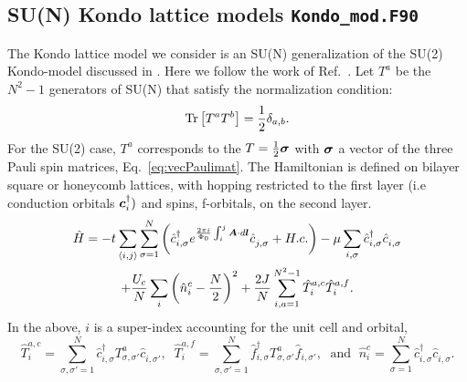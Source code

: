 

\subsection{SU(N) Kondo lattice models \texttt{Kondo\_mod.F90}}  \label{sec:kondo}

The Kondo lattice model we consider is an SU(N) generalization of the SU(2) Kondo-model discussed in \cite{Capponi00,Assaad99a}.
Here we follow the work of  Ref.~\cite{Raczkowski20}.
Let $T^{a}$ be the $N^2 -1  $ generators of SU(N) that satisfy the normalization condition: 
\begin{equation}
	\mathop{\mathrm{Tr}}  \left[ T^{a} T^{b} \right]   = \frac{1}{2}\delta_{a,b}.
\label{Normalization_condition.eq}
\end{equation}
For the SU(2) case, $T^{a}$  corresponds to the $T  = \frac{1}{2} \boldsymbol{\sigma}$ with $\boldsymbol{\sigma}$   a vector of the three Pauli spin matrices, Eq.~\eqref{eq:vecPaulimat}.      The   Hamiltonian is defined on bilayer  square or honeycomb lattices, with  hopping restricted to the  first layer  (i.e  conduction orbitals $\boldsymbol{c}^{\dagger}_{i}  )$   and  spins, f-orbitals, on the second layer. 
\begin{multline}
	\hat{H} = - t  \sum_{\langle i,j \rangle}    \sum_{\sigma=1}^{N}  \left(  \hat{c}^{\dagger}_{i,\sigma}  e^{\frac{2\pi i}{\Phi_0}  \int_{i}^{j} \ve{A}\cdot d \ve{l}}\hat{c}^{\phantom\dagger}_{j,\sigma}   + H.c.  \right)  - \mu \sum_{i,\sigma} \hat{c}^{\dagger}_{i,\sigma}  \hat{c}^{\phantom\dagger}_{i,\sigma}  \\ 
   + \frac{U_c}{N}  \sum_{i}   \left( \hat{n}^c_i -  \frac{N}{2} \right)^2  
         +  \frac{2 J}{N} \sum_{i, a=1  }^{N^2 -1}  \hat{T}^{a,c}_{i}  \hat{T}^{a,f}_{i}. 
\label{Kondo_SUN_Ham.eq}
\end{multline}
In the above, $i$ is a super-index accounting for the unit cell and orbital,
\begin{equation}
	 \hat{T}^{a,c}_{i}   =   \sum_{\sigma,\sigma'=1}^{N} \hat{c}^{\dagger}_{i,\sigma}T^{a}_{\sigma,\sigma'}  \hat{c}^{\phantom\dagger}_{i,\sigma'}, \; \; 
	  \hat{T}^{a,f}_{i}   = \sum_{\sigma,\sigma'=1}^{N} \hat{f}^{\dagger}_{i,\sigma} T^{a}_{\sigma,\sigma'}  \hat{f}^{\phantom\dagger}_{i,\sigma'},  
	  \;\text{ and }\;   \hat{n}^c_i  = \sum_{\sigma=1}^{N} \hat{c}_{i,\sigma}^{\dagger} \hat{c}_{i,\sigma}^{\phantom\dagger} .
\end{equation}
